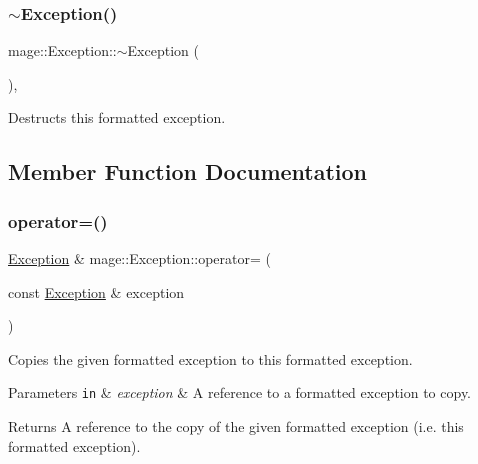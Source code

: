 \subsubsection{\texorpdfstring{$\sim$\+Exception()}{~Exception()}}
{\footnotesize\ttfamily mage\+::\+Exception\+::$\sim$\+Exception (\begin{DoxyParamCaption}{ }\end{DoxyParamCaption})\hspace{0.3cm}{\ttfamily [virtual]}, {\ttfamily [default]}}

Destructs this formatted exception. 

\subsection{Member Function Documentation}
\hypertarget{classmage_1_1_exception_ab0e7e6b32b07505271a4a88067ab54f4}{}\label{classmage_1_1_exception_ab0e7e6b32b07505271a4a88067ab54f4} 
\subsubsection{\texorpdfstring{operator=()}{operator=()}\hspace{0.1cm}{\footnotesize\ttfamily [1/2]}}
{\footnotesize\ttfamily \hyperlink{classmage_1_1_exception}{Exception} \& mage\+::\+Exception\+::operator= (\begin{DoxyParamCaption}\item[{const \hyperlink{classmage_1_1_exception}{Exception} \&}]{exception }\end{DoxyParamCaption})\hspace{0.3cm}{\ttfamily [default]}}

Copies the given formatted exception to this formatted exception.


\begin{DoxyParams}[1]{Parameters}
\mbox{\tt in}  & {\em exception} & A reference to a formatted exception to copy. \\
\hline
\end{DoxyParams}
\begin{DoxyReturn}{Returns}
A reference to the copy of the given formatted exception (i.\+e. this formatted exception). 
\end{DoxyReturn}
\hypertarget{classmage_1_1_exception_aa9305c6bd8836f56ffa970473533f031}{}\label{classmage_1_1_exception_aa9305c6bd8836f56ffa970473533f031} 
